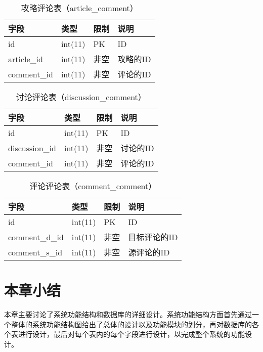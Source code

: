             \begin{table}[htbp]
                \caption{\wuhao 攻略评论表（article\_comment）}
                \vspace{0.5em}\centering\wuhao
                \begin{tabular}{llll}
                    \toprule[1.5pt]
                    字段 & 类型 & 限制 & 说明\\
                    \midrule[1pt]
                    id & int(11) & PK & ID\\
                    article\_id & int(11) & 非空 & 攻略的ID\\
                    comment\_id & int(11) & 非空 & 评论的ID\\
                    \bottomrule[1.5pt]
                \end{tabular}
            \end{table}

            \begin{table}[htbp]
                \caption{\wuhao 讨论评论表（discussion\_comment）}
                \vspace{0.5em}\centering\wuhao
                \begin{tabular}{llll}
                    \toprule[1.5pt]
                    字段 & 类型 & 限制 & 说明\\
                    \midrule[1pt]
                    id & int(11) & PK & ID\\
                    discussion\_id & int(11) & 非空 & 讨论的ID\\
                    comment\_id & int(11) & 非空 & 评论的ID\\
                    \bottomrule[1.5pt]
                \end{tabular}
            \end{table}

            \begin{table}[htbp]
                \caption{\wuhao 评论评论表（comment\_comment）}
                \vspace{0.5em}\centering\wuhao
                \begin{tabular}{llll}
                    \toprule[1.5pt]
                    字段 & 类型 & 限制 & 说明\\
                    \midrule[1pt]
                    id & int(11) & PK & ID\\
                    comment\_d\_id & int(11) & 非空 & 目标评论的ID\\
                    comment\_s\_id & int(11) & 非空 & 源评论的ID\\
                    \bottomrule[1.5pt]
                \end{tabular}
            \end{table}

    \section{本章小结}

        本章主要讨论了系统功能结构和数据库的详细设计。系统功能结构方面首先通过一个整体的系统功能结构图给出了总体的设计以及功能模块的划分，再对数据库的各个表进行设计，最后对每个表内的每个字段进行设计，以完成整个系统的功能设计。